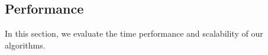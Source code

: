 




\subsection{Performance}\label{sec:eval:performance}
In this section, we evaluate the time performance and scalability of
our algorithms.

